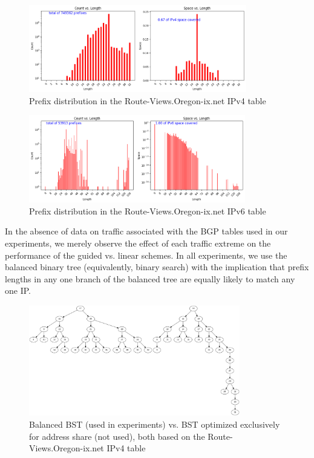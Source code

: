 \documentclass[conference,compsoc]{IEEEtran}
\begin{document}
\begin{figure}[h]
\centering
\includegraphics[height=1.5in]{../img/prefix_distribution_v4.png}
  \caption{Prefix distribution in the Route-Views.Oregon-ix.net IPv4 table}
\label{fig:prefixes-v4}
\end{figure}

\begin{figure}[h]
\centering
\includegraphics[height=1.5in]{../img/prefix_distribution_v6.png}
  \caption{Prefix distribution in the Route-Views.Oregon-ix.net IPv6 table}
\label{fig:prefixes-v6}
\end{figure}

In the absence of data on traffic associated with the BGP tables
used in our experiments, we merely observe the effect of each traffic
extreme on the performance of the guided vs. linear schemes. In all
experiments, we use the balanced binary tree (equivalently, binary search)
with the implication that prefix lengths in any one branch of the
balanced tree are equally likely to match any one IP.

\begin{figure}[h]
\centering
\includegraphics[height=1.9in]{../img/trees_v4.png}
  \caption{Balanced BST (used in experiments) vs. BST optimized exclusively for address share (not used), both based on the Route-Views.Oregon-ix.net IPv4 table}
\label{fig:trees-v4}
\end{figure}
\end{document}
